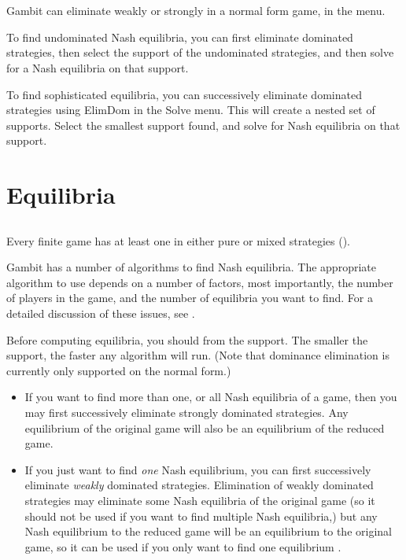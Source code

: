 {\section{}\label{domsec}

Gambit can eliminate weakly or strongly 
 in a 
normal form game, in the  menu.  

To find undominated Nash equilibria, you can first eliminate dominated 
strategies, then select the support of the undominated strategies, and then 
solve for a Nash equilibria on that support.  

To find sophisticated equilibria, you can successively eliminate 
dominated strategies using ElimDom in the Solve menu.  This will 
create a nested set of supports.  
Select the smallest support found, and solve for Nash equilibria on that 
support.  

\section{Equilibria}

\subsection{}\label{nashsec}
Every finite game has at least one  in either pure or mixed strategies (\cite{Nash:1950}).  

Gambit has a number of algorithms to find Nash equilibria.  
The appropriate algorithm to use 
depends on a number of factors, most importantly, the number of players in the 
game, and the number of equilibria you want to find.  For a detailed 
discussion of these issues, see \cite{McKMcL:1996}.  

Before computing equilibria, you should 
 from 
the support.  The smaller the support, the faster any algorithm will run.  (Note that 
dominance elimination is currently only supported on the normal form.) 
\begin{itemize}
\item 
If you want to find more than one, or all Nash equilibria of a game, then you may first 
successively eliminate strongly dominated strategies.  Any equilibrium of the original 
game will also be an equilibrium of the reduced game. 
\item 
If you just want to find {\em one} Nash equilibrium, you can first successively eliminate 
{\em weakly} dominated strategies.  Elimination of weakly dominated strategies may 
eliminate some Nash equilibria of the original game (so it should not be used if you 
want to find multiple Nash equilibria,) but any Nash equilibrium to the reduced 
game will be an equilibrium to the original game, so it can be used if you only 
want to find one equilibrium .  
\end{itemize}

}

